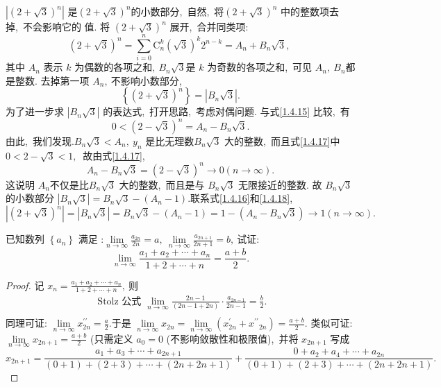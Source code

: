 \begin{solution}
	$\left|(2+\sqrt{3})^{n}\right|$  是$  (2+\sqrt{3})^{n}  $的小数部分,\  自然,\  将$  (2+\sqrt{3})^{n} $ 中的整数项去掉,\  不会影响它的 值. 将  $(2+\sqrt{3})^{n} $ 展开,\ 合并同类项:\begin{equation}
		(2+\sqrt{3})^{n}=\sum_{i=0}^{n} \mathrm{C}_{n}^{k}(\sqrt{3})^{k} 2^{n-k}=A_{n}+B_{n} \sqrt{3},\ \label{1.4.15}
	\end{equation}
	其中 $ A_{n} $ 表示  $k$  为偶数的各项之和$,\   B_{n} \sqrt{3}  $是 $ k $ 为奇数的各项之和,\  可见 $ A_{n},\  B_{n}  $都是整数. 去掉第一项 $ A_{n} ,\  $不影响小数部分,\ 
	\begin{equation}
		\left\{(2+\sqrt{3})^{n}\right\}=\left|B_{n} \sqrt{3}\right| .\label{1.4.16}
	\end{equation}
	为了进一步求  $\left|B_{n} \sqrt{3}\right|$  的表达式,\ 打开思路,\  考虑对偶问题. 与式\eqref{1.4.15} 比较,\  有
	\begin{equation}
		0<(2-\sqrt{3})^{n}=A_{n}-B_{n} \sqrt{3} .\label{1.4.17}
	\end{equation}
	由此,\  我们发现.$  B_{n} \sqrt{3}<A_{n},\  y_{n}$  是比无理数$  B_{n} \sqrt{3}$  大的整数,\  而且式\eqref{1.4.17}中 $ 0<2-\sqrt{3}<1 ,\ $ 故由式\eqref{1.4.17},\ 
	\begin{equation}
		A_{n}-B_{n} \sqrt{3}=(2-\sqrt{3})^{n} \rightarrow 0(n \rightarrow \infty) .\label{1.4.18}
	\end{equation}
	这说明 $ A_{n}  $不仅是比$  B_{n} \sqrt{3} $ 大的整数,\  而且是与 $ B_{n} \sqrt{3} $ 无限接近的整数. 故  $B_{n} \sqrt{3} $ 的小数部分 $ \left|B_{n} \sqrt{3}\right|=   B_{n} \sqrt{3}-\left(A_{n}-1\right) . $联系式\eqref{1.4.16}和\eqref{1.4.18},\ 
	$$\left|(2+\sqrt{3})^{n}\right|=\left|B_{n} \sqrt{3}\right|=B_{n} \sqrt{3}-\left(A_{n}-1\right)=1-\left(A_{n}-B_{n} \sqrt{3}\right) \rightarrow 1(n \rightarrow \infty) .$$
\end{solution}
\newpage
\begin{problem}
	已知数列 $ \left\{a_{n}\right\} $ 满足 :$  \lim\limits_{n \rightarrow \infty} \frac{a_{2 n}}{2 n}=a,\  \lim\limits_{n \rightarrow \infty} \frac{a_{2 n+1}}{2 n+1}=b ,\  $试证:
	$$\lim\limits_{n \rightarrow \infty} \frac{a_{1}+a_{2}+\cdots+a_{n}}{1+2+\cdots+n}=\frac{a+b}{2}.$$
\end{problem}
\begin{proof}
	记  $x_{n}=\frac{a_{1}+a_{2}+\cdots+a_{n}}{1+2+\cdots+n} ,\  $则
	$$\begin{array}{l}
		\text { Stolz 公式 } \lim\limits_{n \rightarrow \infty} \frac{2 n-1}{(2 n-1+2 n)} \cdot \frac{a_{2 n-1}}{2 n-1}=\frac{b}{2}. \\
	\end{array}$$
	同理可证: $ \lim\limits_{n \rightarrow \infty} x_{2 n}^{\prime \prime}=\frac{a}{2} . $于是  $\lim\limits_{n \rightarrow \infty} x_{2 n}=\lim\limits_{n \rightarrow \infty}\left(x_{2 n}^{\prime}+x^{\prime \prime}{ }_{2 n}\right)=\frac{a+b}{2} .$
	类似可证:  $\lim\limits_{n \rightarrow \infty} x_{2 n+1}=\frac{a+b}{2} $ (只需定义 $ a_{0}=0 $ (不影响敛散性和极限值),\ 并将 $ x_{2 n+1} $ 写成
	$$x_{2 n+1}=\frac{a_{1}+a_{3}+\cdots+a_{2 n+1}}{(0+1)+(2+3)+\cdots+(2 n+2 n+1)}+	\frac{0+a_{2}+a_{4}+\cdots+a_{2 n}}{(0+1)+(2+3)+\cdots+(2 n+2 n+1)} .$$
\end{proof}
